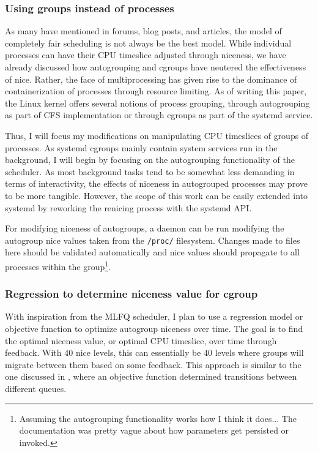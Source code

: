 \documentclass[12pt]{article}
\def\ind{\hspace*{0.3in}}
\begin{document}
\subsubsection*{Using groups instead of processes}

\ind As many have mentioned in forums, blog posts, and articles, the model of completely fair scheduling is not always be the best model. While individual processes can have their CPU timeslice adjusted through niceness, we have already discussed how autogrouping and cgroups have neutered the effectiveness of nice. Rather, the face of multiprocessing has given rise to the dominance of containerization of processes through resource limiting. As of writing this paper, the Linux kernel offers several notions of process grouping, through autogrouping as part of CFS implementation or through cgroups as part of the systemd service. 

Thus, I will focus my modifications on manipulating CPU timeslices of groups of processes. As systemd cgroups mainly contain system services run in the background, I will begin by focusing on the autogrouping functionality of the scheduler. As most background tasks tend to be somewhat less demanding in terms of interactivity, the effects of niceness in autogrouped processes may prove to be more tangible. However, the scope of this work can be easily extended into systemd by reworking the renicing process with the systemd API.

For modifying niceness of autogroups, a daemon can be run modifying the autogroup nice values taken from the \texttt{/proc/} filesystem. Changes made to files here should be validated automatically and nice values should propagate to all processes within the group\footnote{Assuming the autogrouping functionality works how I think it does... The documentation was pretty vague about how parameters get persisted or invoked.}.


\subsubsection*{Regression to determine niceness value for cgroup}

\ind With inspiration from the MLFQ scheduler, I plan to use a regression model or objective function to optimize autogroup niceness over time. The goal is to find the optimal niceness value, or optimal CPU timeslice, over time through feedback. With 40 nice levels, this can essentially be 40 levels where groups will migrate between them based on some feedback. This approach is similar to the one discussed in \cite{rinkuReinforcementLearningBased2020}, where an objective function determined transitions between different queues.
\end{document}
